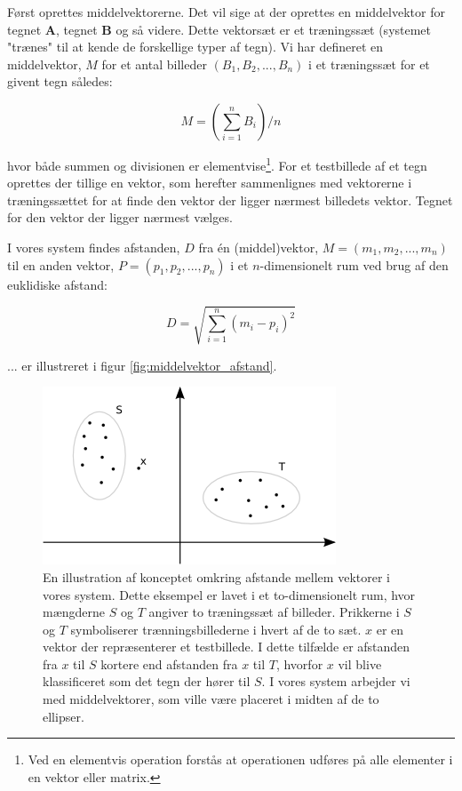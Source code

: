 Først oprettes middelvektorerne. Det vil sige at der oprettes en middelvektor for tegnet \textbf{A}, tegnet \textbf{B} og så videre. Dette vektorsæt er et træningssæt (systemet "trænes" til at kende de forskellige typer af tegn). Vi har defineret en middelvektor, $M$ for et antal billeder $(B_{1},B_{2},...,B_{n})$ i et træningssæt for et givent tegn således:

\begin{displaymath}
	M = (\sum_{i=1}^{n}B_i)/n
\end{displaymath}


hvor både summen og divisionen er elementvise\footnote{Ved en elementvis operation forstås at operationen udføres på alle elementer i en vektor eller matrix.}. For et testbillede af et tegn oprettes der tillige en vektor, som herefter sammenlignes med vektorerne i træningssættet for at finde den vektor der ligger nærmest billedets vektor. Tegnet for den vektor der ligger nærmest vælges.

I vores system findes afstanden, $D$ fra én (middel)vektor, $M = (m_{1},m_{2},...,m_{n})$ til en anden vektor, $P = (p_{1},p_{2},...,p_{n})$ i et $n$-dimensionelt rum ved brug af den euklidiske afstand\cite{wiki_euclid}:

\begin{displaymath}
	D = \sqrt{\sum_{i=1}^{n}(m_{i}-p_{i})^{2}}
\end{displaymath}

... er illustreret i figur \vref{fig:middelvektor_afstand}.

\begin{figure}[htp]
\centering
\includegraphics{system/illu/middelvektor_afstand.png} 
\caption{En illustration af konceptet omkring afstande mellem vektorer i vores system. Dette eksempel er lavet i et to-dimensionelt rum, hvor mængderne $S$ og $T$ angiver to træningssæt af billeder. Prikkerne i $S$ og $T$ symboliserer trænningsbillederne i hvert af de to sæt. $x$ er en vektor der repræsenterer et testbillede. I dette tilfælde er afstanden fra $x$ til $S$ kortere end afstanden fra $x$ til $T$, hvorfor $x$ vil blive klassificeret som det tegn der hører til $S$. I vores system arbejder vi med middelvektorer, som ville være placeret i midten af de to ellipser.}
\label{fig:middelvektor_afstand}
\end{figure}

